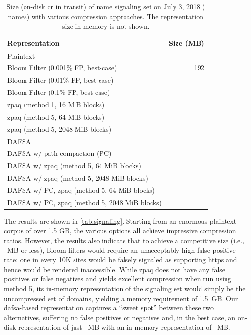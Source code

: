 \begin{table}[tbp]
  \centering
  \caption{Size (on-disk or in transit) of \ac{name} signaling set on
    July 3, 2018 (\numnames{} names) with various compression approaches. The
    representation size in memory is not shown.}
  \begin{tabular}{|lr|}
    \toprule
    \textbf{Representation} & \textbf{Size (MB)} \\
    \midrule
    Plaintext & \plaintextsize \\
    \midrule
    Bloom Filter (0.001\% FP, best-case) & 192 \\
    Bloom Filter (0.01\% FP, best-case) & \bloomlargesize \\
    Bloom Filter (0.1\% FP, best-case) & \bloommedsize \\
    \midrule
    zpaq (method 1, 16 MiB blocks) & \zpaqlargesize \\
    zpaq (method 5, 64 MiB blocks) & \zpaqmedsize \\
    zpaq (method 5, 2048 MiB blocks) & \zpaqsmallsize \\
    \midrule
    DAFSA & \fsalargesize \\
    DAFSA w/ path compaction (PC) & \fsamedsize \\
    DAFSA w/ zpaq (method 5, 64 MiB blocks) & \fsazpaqlargesize \\
    DAFSA w/ zpaq (method 5, 2048 MiB blocks) & \fsazpaqmedsize \\
    DAFSA w/ PC, zpaq (method 5, 64 MiB blocks) & \fsapczpaqlargesize \\
    DAFSA w/ PC, zpaq (method 5, 2048 MiB blocks) & \fsapczpaqmedsize \\
    \bottomrule
  \end{tabular}
  \label{tab:signaling}
\end{table}

The results are shown in \autoref{tab:signaling}.
Starting from an enormous plaintext corpus of over 1.5 GB,
the various options all achieve impressive compression ratios.
However, the results also indicate that to achieve a competitive size (i.e.,
\bloomlargesize{}~MB or less),
Bloom filters would require an unacceptably high false 
positive rate: one in every 10K sites would be falsely signaled
as supporting \ac{https} and hence would be rendered inaccessible.
While zpaq does not have any false positives or false
negatives and yields excellent compression when run using method 5, 
its in-memory representation of the
signaling set would simply be the uncompressed set of domains, yielding a memory
requirement of 1.5~GB. Our \ac{dafsa}-based representation captures a ``sweet
spot'' between these two alternatives, suffering no false positives or negatives and, in the
best case, an on-disk representation of just \fsapczpaqmedsize{}~MB with an in-memory
representation of \fsamedsize{}~MB.

